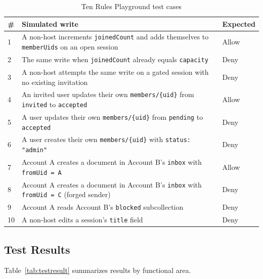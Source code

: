 \begin{table}[h]
\centering
\caption{Ten Rules Playground test cases}
\label{tab:rulesplayground}
\begin{tabular}{p{0.5cm}p{8.5cm}p{1.8cm}}
\toprule
\textbf{\#} & \textbf{Simulated write} & \textbf{Expected} \\
\midrule
1 & A non-host increments \texttt{joinedCount} and adds themselves to \texttt{memberUids} on an open session & Allow \\
2 & The same write when \texttt{joinedCount} already equals \texttt{capacity} & Deny \\
3 & A non-host attempts the same write on a gated session with no existing invitation & Deny \\
4 & An invited user updates their own \texttt{members/\{uid\}} from \texttt{invited} to \texttt{accepted} & Allow \\
5 & A user updates their own \texttt{members/\{uid\}} from \texttt{pending} to \texttt{accepted} & Deny \\
6 & A user creates their own \texttt{members/\{uid\}} with \texttt{status: "admin"} & Deny \\
7 & Account A creates a document in Account B's \texttt{inbox} with \texttt{fromUid = A} & Allow \\
8 & Account A creates a document in Account B's \texttt{inbox} with \texttt{fromUid = C} (forged sender) & Deny \\
9 & Account A reads Account B's \texttt{blocked} subcollection & Deny \\
10 & A non-host edits a session's \texttt{title} field & Deny \\
\bottomrule
\end{tabular}
\end{table}

\subsection{Test Results}

Table~\ref{tab:testresult} summarizes results by functional area.

